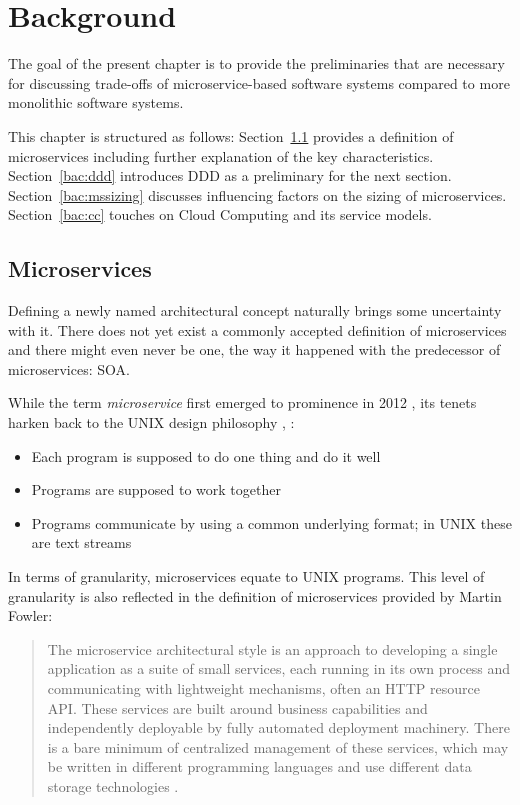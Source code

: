\chapter{Background}
\label{bac}
The goal of the present chapter is to provide the preliminaries that are necessary for discussing trade-offs of microservice-based software systems compared to more monolithic software systems.

This chapter is structured as follows:
Section~\ref{bac:microservices} provides a definition of microservices including further explanation of the key characteristics.
Section~\ref{bac:ddd} introduces \ac{DDD} as a preliminary for the next section.
Section~\ref{bac:mssizing} discusses influencing factors on the sizing of microservices.
Section~\ref{bac:cc} touches on Cloud Computing and its service models.


\section{Microservices}
\label{bac:microservices}
Defining a newly named architectural concept naturally brings some uncertainty with it.
There does not yet exist a commonly accepted definition of microservices and there might even never be one, the way it happened with the predecessor of microservices: \ac{SOA}.

While the term \textit{microservice} first emerged to prominence in 2012 \citep[Footnote 1]{Fowler2014}, its tenets harken back to the UNIX design philosophy \citep[p. 76]{Hunt2000}, \citep[p. 2]{Wolff2016}:
\begin{itemize}
  \item Each program is supposed to do one thing and do it well
  \item Programs are supposed to work together
  \item Programs communicate by using a common underlying format; in UNIX these are text streams
\end{itemize}

In terms of granularity, microservices equate to UNIX programs.
This level of granularity is also reflected in the definition of microservices provided by Martin Fowler:

\begin{quote}
The microservice architectural style is an approach to developing a single application as a suite of small services, each running in its own process and communicating with lightweight mechanisms, often an \acs{HTTP} resource \acs{API}.
These services are built around business capabilities and independently deployable by fully automated deployment machinery.
There is a bare minimum of centralized management of these services, which may be written in different programming languages and use different data storage technologies \cite{Fowler2014}.
\end{quote}

